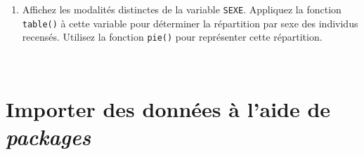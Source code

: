 \documentclass[12pt,twosided, notitlepage]{book}
\newenvironment{Shaded}{}{}
\newcommand{\KeywordTok}[1]{\textcolor[rgb]{0.00,0.00,1.00}{#1}}
\newcommand{\DataTypeTok}[1]{#1}
\newcommand{\StringTok}[1]{\textcolor[rgb]{0.00,0.50,0.50}{#1}}
\newcommand{\CommentTok}[1]{\textcolor[rgb]{0.00,0.50,0.00}{#1}}
\newcommand{\OperatorTok}[1]{#1}
\newcommand{\NormalTok}[1]{#1}
\newif \ifsol
\renewenvironment{Shaded}{\begin{snugshade}}{\end{snugshade}}
\begin{document}
\begin{enumerate}
  \begin{center} \rule{0.5\linewidth}{\linethickness}\end{center}

  \bigskip  \fi 
\item
  Affichez les modalités distinctes de la variable
  \texttt{SEXE}. Appliquez la fonction
  \texttt{table()} à cette variable pour
  déterminer la répartition par sexe des individus recensés. Utilisez la
  fonction \texttt{pie()} pour représenter cette
  répartition.

  \ifsol 

  \begin{center} \rule{0.5\linewidth}{\linethickness}\end{center}

\begin{Shaded}
\begin{Highlighting}[]
\CommentTok{# Pour afficher les modalités distinctes d'une variable, on utilise}
\CommentTok{# la fonction unique()}
\KeywordTok{unique}\NormalTok{(rp}\OperatorTok{$}\NormalTok{SEXE)}
\NormalTok{  ## [1] 1 2}
\CommentTok{# Comme souvent, le sexe est codé par un chiffre, "1" pour}
\CommentTok{# les hommes et "2" pour les femmes.}
\KeywordTok{table}\NormalTok{(rp}\OperatorTok{$}\NormalTok{SEXE)}
\NormalTok{  ## }
\NormalTok{  ##      1      2 }
\NormalTok{  ## 290444 319002}
\CommentTok{# La fonction table() permet d'effectuer une tabulation}
\CommentTok{# simple (et non pondérée) d'une variable}

\CommentTok{# Pour représenter cette répartition, il suffit d'utiliser la fonction}
\CommentTok{# pie() avec comme données le résultat de la fonction table()}
\KeywordTok{pie}\NormalTok{(}
  \KeywordTok{table}\NormalTok{(rp}\OperatorTok{$}\NormalTok{SEXE)}
\NormalTok{  , }\DataTypeTok{main =} \StringTok{"Sexe des individus recensés au RP 2013"}
\NormalTok{)}
\end{Highlighting}
\end{Shaded}

  \texttt{[image: livret\_files/figure-latex/unnamed-chunk-85-1.pdf]}

  \begin{center} \rule{0.5\linewidth}{\linethickness}\end{center}

  \bigskip  \fi 
\end{enumerate}

~

\section{\texorpdfstring{Importer des données à l'aide de
\emph{packages}}{Importer des données à l'aide de packages}}\label{importer-des-donnees-a-laide-de-packages}
\end{document}
